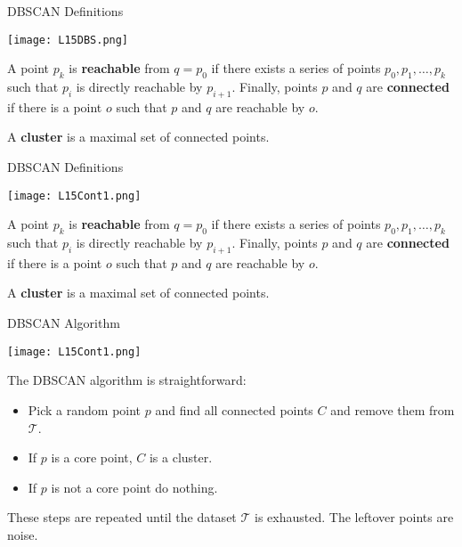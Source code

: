 \documentclass[10pt, table, dvipsnames,xcdraw,handout]{beamer}
\begin{document}
\begin{frame}[fragile]{DBSCAN Definitions}
  \begin{minipage}[t][0.5\textheight][t]{\textwidth}
	\centering \texttt{[image: L15DBS.png]} 
  \end{minipage}
  \vfill
\begin{minipage}[t][0.5\textheight][t]{\textwidth}
A point $p_k$ is \textbf{reachable} from $q = p_0$ if there exists a series of points $p_0, p_1,\ldots, p_k$ such that $p_{i}$ is directly reachable by $p_{i+1}$. \pause  Finally, points $p$ and $q$ are \textbf{connected} if there is a point $o$ such that $p$ and $q$ are reachable by $o$. \pause\newline

A \textbf{cluster} is a maximal set of connected points. 
\end{minipage}
\end{frame}




\begin{frame}[fragile]{DBSCAN Definitions}
  \begin{minipage}[t][0.5\textheight][t]{\textwidth}
	\centering \texttt{[image: L15Cont1.png]} 
  \end{minipage}
  \vfill
\begin{minipage}[t][0.5\textheight][t]{\textwidth}
A point $p_k$ is \textbf{reachable} from $q = p_0$ if there exists a series of points $p_0, p_1,\ldots, p_k$ such that $p_{i}$ is directly reachable by $p_{i+1}$. Finally, points $p$ and $q$ are \textbf{connected} if there is a point $o$ such that $p$ and $q$ are reachable by $o$. 

A \textbf{cluster} is a maximal set of connected points. 
\end{minipage}
\end{frame}



\begin{frame}[fragile]{DBSCAN Algorithm}
  \begin{minipage}[t][0.5\textheight][t]{\textwidth}
	\centering \texttt{[image: L15Cont1.png]} 
  \end{minipage}
  \vfill
\begin{minipage}[t][0.5\textheight][t]{\textwidth}
The DBSCAN algorithm is straightforward: 
\begin{itemize}
\item[] Pick a random point $p$ and find all connected points $C$ and remove them from $\mathcal{T}$.\pause
\item[] If $p$ is a core point, $C$ is a cluster. \pause
\item[] If $p$ is not a core point do nothing. \pause
\end{itemize}
These steps are repeated until the dataset $\mathcal{T}$ is exhausted. The leftover points are noise. 
\end{minipage}
\end{frame}
\end{document}
